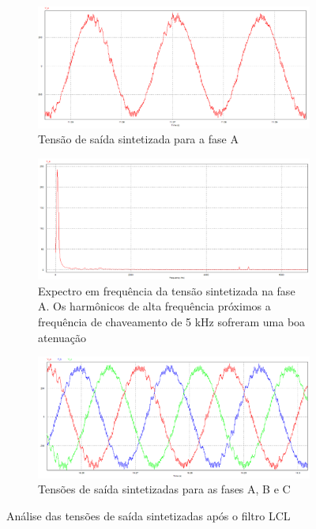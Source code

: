 \begin{figure}[!hbt]
	\centering
	\begin{subfigure}[b]{0.5\textwidth}
		\centering
		\includegraphics[width=\textwidth]{figuras/sim_figures/sistema_completo/tensao_saida_inversor_2.PNG}
		\caption{Tensão de saída sintetizada para a fase A}
   \end{subfigure}

   \begin{subfigure}[b]{0.5\textwidth}
		\centering
		\includegraphics[width=\textwidth]{figuras/sim_figures/sistema_completo/tensao_saida_inversor_fft.PNG}
		\caption{Expectro em frequência da tensão sintetizada na fase A. Os harmônicos de alta frequência próximos a frequência de chaveamento de 5 kHz sofreram uma boa atenuação}
   \end{subfigure}

	\begin{subfigure}[b]{0.5\textwidth}
		\centering
		\includegraphics[width=\textwidth]{figuras/sim_figures/sistema_completo/tensao_saida_inversor_4.PNG}
		\caption{Tensões de saída sintetizadas para as fases A, B e C}
	\end{subfigure}
    \caption{Análise das tensões de saída sintetizadas após o filtro LCL}
    \label{fig:sim-tensao-saida-inversor}
\end{figure}

